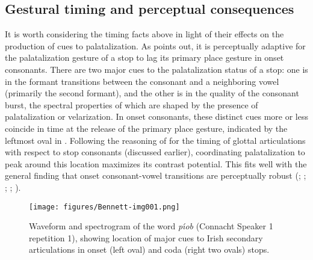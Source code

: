 \documentclass[output=paper,colorlinks,citecolor=brown]{langscibook}
\begin{document}
\subsection{Gestural timing and perceptual consequences}\label{sec:timing_percep}
It is worth considering the timing facts above in light of their effects on the production of cues to palatalization. As \citet{Kochetov2006_syll_poss} points out, it is perceptually adaptive for the palatalization gesture of a stop to lag its primary place gesture in onset consonants. There are two major cues to the palatalization status of a stop: one is in the formant transitions between the consonant and a neighboring vowel (primarily the second formant), and the other is in the quality of the consonant burst, the spectral properties of which are shaped by the presence of palatalization or velarization. In onset consonants, these distinct cues more or less coincide in time at the release of the primary place gesture, indicated by the leftmost oval in . Following the reasoning of \citet{Kingston1990_artic_binding} for the timing of glottal articulations with respect to stop consonants (discussed earlier), coordinating palatalization to peak around this location maximizes its contrast potential. This fits well with the general finding that onset consonant-vowel transitions are perceptually robust (\cite{Fujimura_etal1978_stop_transition}; \cite{Ohala1990_assimilation}; \cite{Steriade2001}; \cite{Wright2004_cue_robustness}; \cite{Kochetov2006_syll_poss}).

\begin{figure}[!htb]
    \centering
    \texttt{[image: figures/Bennett-img001.png]}
    \caption{Waveform and spectrogram of the word \emph{p\'{\i}ob}  (Connacht Speaker 1 repetition 1), showing location of major cues to Irish secondary articulations in onset (left oval) and coda (right two ovals) stops.}
    \label{fig:spectrogram}
\end{figure}
\end{document}
